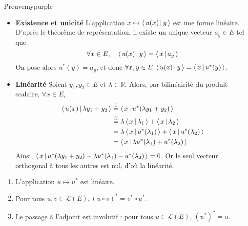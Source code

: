    \begin{demo}{Preuve}{mypurple}
        \begin{itemize}
            \item \textbf{Existence et unicité} \quad L’application $x \mapsto \left<\,u(x)\,\middle|\,y\,\right>$ est une forme linéaire. D’après le théorème de représentation, il existe un unique vecteur $a_y \in E$ tel que 
            \[ \forall x \in E, \quad \left<\,u(x)\,\middle|\,y\,\right> = \left<\,x\,\middle|\,a_y\,\right> \]   
            On pose alors $u^*(y) = a_y$, et donc $\forall x,y \in E, \left<\,u(x)\,\middle|\,y\,\right> = \left<\,x\,\middle|\,u^*(y)\,\right>$.
            \item \textbf{Linéarité} \quad Soient $y_1,y_2 \in E$ et $\lambda \in \mathbb{R}$. Alors, par bilinéairité du produit scalaire, $\forall x \in E$, 
            \begin{align*}
                \left<\,u(x)\,\middle|\,\lambda y_1 + y_2\,\right> 
                &\overset{i}{=} \left<\,x\,\middle|\,u^*(\lambda y_1 + y_2)\,\right> \\
                &\overset{ii}{=} \lambda \left<\,x\,\middle|\,\lambda_1\,\right> + \left<\,x\,\middle|\,\lambda_2\,\right> \\
                &= \lambda \left<\,x\,\middle|\,u^*(\lambda_1)\,\right> + \left<\,x\,\middle|\,u^*(\lambda_2)\,\right> \\
                &= \left<\,x\,\middle|\,\lambda u^*(\lambda_1) + u^*(\lambda_2)\,\right> 
            \end{align*}
            Ainsi, $\left<\,x\,\middle|\,u^*(\lambda y_1 + y_2) - \lambda u^*(\lambda_1) - u^*(\lambda_2)\,\right> = 0$. Or le seul vecteur orthogonal à tous les autres est nul, d’où la linéarité.
        \end{itemize}
    \end{demo}

    \begin{prop}{}{}
        \begin{enumerate}
            \item L’application $u \mapsto u^*$ est linéaire.
            \item Pour tous $u,v \in \mathcal{L}(E), (u \circ v)^* = v^* \circ u^*$.
            \item Le passage à l’adjoint est involutif : pour tous $u \in \mathcal{L}(E)$, $(u^*)^* = u$.
        \end{enumerate}
    \end{prop}


